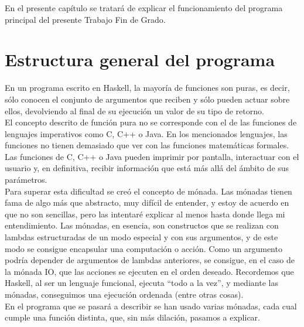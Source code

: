 

En el presente cap\'itulo se tratar\'a de explicar el funcionamiento del programa principal del presente Trabajo Fin de Grado.

\section{Estructura general del programa}
\label{3:sec1}

En un programa escrito en Haskell, la mayor\'ia de funciones son puras, es decir, s\'olo conocen el conjunto de argumentos que reciben y s\'olo pueden actuar sobre ellos, devolviendo al final de su ejecuci\'on un valor de su tipo de retorno.\\

El concepto descrito de funci\'on pura no se corresponde con el de las funciones de lenguajes imperativos como C, C++ o Java. En los mencionados lenguajes, las funciones no tienen demasiado que ver con las funciones matem\'aticas formales. Las funciones de C, C++ o Java pueden imprimir por pantalla, interactuar con el usuario y, en definitiva, recibir informaci\'on que est\'a m\'as all\'a del \'ambito de sus par\'ametros.\\

Para superar esta dificultad se cre\'o el concepto de m\'onada. Las m\'onadas tienen fama de algo m\'as que abstracto, muy dif\'icil de entender, y estoy de acuerdo en que no son sencillas, pero las intentar\'e explicar al menos hasta donde llega mi entendimiento. Las m\'onadas, en esencia, son constructos que se realizan con lambdas estructuradas de un modo especial y con sus argumentos, y de este modo se consigue encapsular una computaci\'on o acci\'on. Como un argumento podr\'ia depender de argumentos de lambdas anteriores, se consigue, en el caso de la m\'onada IO, que las acciones se ejecuten en el orden deseado. Recordemos que Haskell, al ser un lenguaje funcional, ejecuta ``todo a la vez'', y mediante las m\'onadas, conseguimos una ejecuci\'on ordenada (entre otras cosas).\\

En el programa que se pasar\'a a describir se han usado varias m\'onadas, cada cual cumple una funci\'on distinta, que, sin m\'as dilaci\'on, pasamos a explicar.\\

